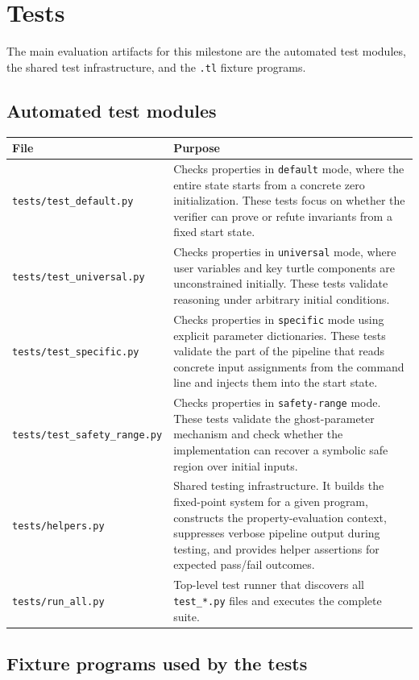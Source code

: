 \section*{Tests}
\label{sec:tests}

The main evaluation artifacts for this milestone are the automated test modules, the shared test infrastructure, and the \texttt{.tl} fixture programs.

\subsection*{Automated test modules}

\begin{longtable}{p{} p{}}
\toprule
\textbf{File} & \textbf{Purpose} \\
\midrule
\texttt{tests/test\_default.py} & Checks properties in \texttt{default} mode, where the entire state starts from a concrete zero initialization. These tests focus on whether the verifier can prove or refute invariants from a fixed start state. \\
\texttt{tests/test\_universal.py} & Checks properties in \texttt{universal} mode, where user variables and key turtle components are unconstrained initially. These tests validate reasoning under arbitrary initial conditions. \\
\texttt{tests/test\_specific.py} & Checks properties in \texttt{specific} mode using explicit parameter dictionaries. These tests validate the part of the pipeline that reads concrete input assignments from the command line and injects them into the start state. \\
\texttt{tests/test\_safety\_range.py} & Checks properties in \texttt{safety-range} mode. These tests validate the ghost-parameter mechanism and check whether the implementation can recover a symbolic safe region over initial inputs. \\
\texttt{tests/helpers.py} & Shared testing infrastructure. It builds the fixed-point system for a given program, constructs the property-evaluation context, suppresses verbose pipeline output during testing, and provides helper assertions for expected pass/fail outcomes. \\
\texttt{tests/run\_all.py} & Top-level test runner that discovers all \texttt{test\_*.py} files and executes the complete suite. \\
\bottomrule
\end{longtable}

\subsection*{Fixture programs used by the tests}

